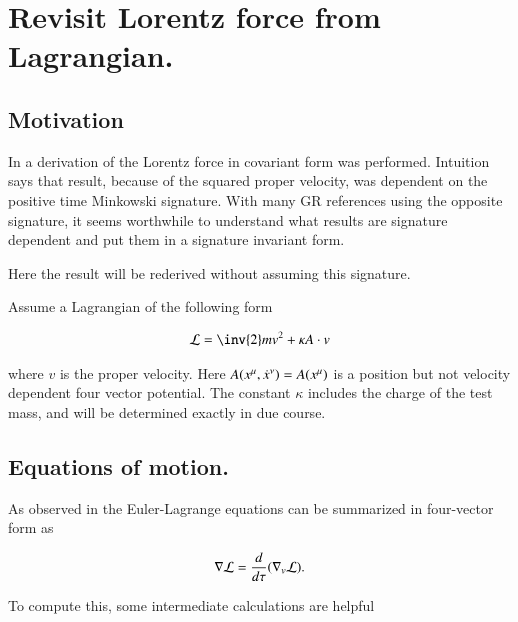 \chapter{Revisit Lorentz force from Lagrangian.}\label{chap:PJSrLorentzForce}
\date{ October 8, 2008.  $RCSfile: lorentzForce.tex,v $ Last $Revision: 1.12 $ $Date: 2009/10/22 02:07:20 $ }

\section{Motivation }

In  a derivation of the Lorentz force in covariant
form was performed.  Intuition says that result, because of the squared
proper velocity, was dependent on the 
positive time Minkowski signature.
With many
GR references using the opposite signature, it seems worthwhile to understand
what results are signature dependent and put them in a signature invariant form.

Here the result will be rederived without assuming this signature.

Assume a Lagrangian of the following form

\begin{align}\label{eqn:lorForce:potlag}
\LL = \inv{2}m v^2 + \kappa A \cdot v
\end{align}

where $v$ is the proper velocity.  Here $A(x^\mu,\dot{x}^\nu) = A(x^\mu)$ is a position but not velocity dependent four vector potential.  The constant $\kappa$ includes the charge of the test mass, and will be determined exactly in due course.

\section{Equations of motion. }

As observed in  the Euler-Lagrange equations can be summarized in four-vector form as

\begin{align}
\nabla \mathcal{L} = \frac{d}{d\tau}(\nabla_v \mathcal{L}).
\end{align}

To compute this, some intermediate calculations are helpful

